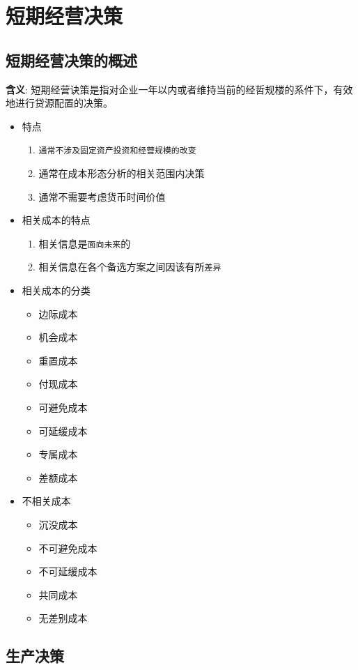 \documentclass[11pt]{article}
\begin{document}
\section{短期经营决策}
\label{sec:orgf2928fe}
\subsection{短期经营决策的概述}
\label{sec:orgcdb78fa}
\textbf{含义}: 短期经营诀策是指对企业一年以内或者维持当前的经哲规楼的系件下，有效地进行贷源配置的决策。
\begin{itemize}
\item 特点
\begin{enumerate}
\item \texttt{通常不涉及固定资产投资和经营规模的改变}
\item 通常在成本形态分析的相关范围内决策
\item 通常不需要考虑货币时间价值
\end{enumerate}
\item 相关成本的特点
\begin{enumerate}
\item 相关信息是\texttt{面向未来}的
\item 相关信息在各个备选方案之间因该有所\texttt{差异}
\end{enumerate}
\item 相关成本的分类
\begin{itemize}
\item 边际成本
\item 机会成本
\item 重置成本
\item 付现成本
\item 可避免成本
\item 可延缓成本
\item 专属成本
\item 差额成本
\end{itemize}
\item 不相关成本
\begin{itemize}
\item 沉没成本
\item 不可避免成本
\item 不可延缓成本
\item 共同成本
\item 无差别成本
\end{itemize}
\end{itemize}
\subsection{生产决策}
\label{sec:orgaa7ecde}
\end{document}
